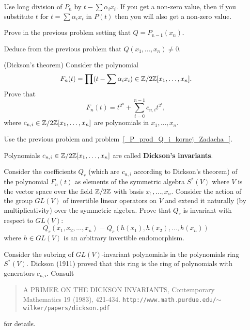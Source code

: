 \documentclass[12pt]{article}
\begin{document}
\begin{ukazanie}
Use long division of $P_n$ by $t-\sum \alpha_i x_i$. If you get a
non-zero value, then if you substitute $t$ for $t=\sum \alpha_i x_i$
in $P(t)$ then you will also get a non-zero value.
\end{ukazanie}

\begin{zadacha}[*]
Prove in the previous problem setting that $Q = P_{n-1}(x_n)$.
\end{zadacha}

\begin{zadacha}[*]
Deduce from the previous problem that
$Q(x_1, \dots, x_n)\neq 0$.
\end{zadacha}

\begin{zadacha}[*]
(Dickson's theorem)
Consider the polynomial 
$$
F_n(t)=\prod (t-\sum
 \alpha_i x_i)\in {\mathbb Z}/2{\mathbb Z}[x_1, \dots, x_n].
$$ 
Prove that 
\[ 
F_n(t) = t^{2^n} + \sum^{n-1}_{i=0} c_{n,i} t^{2^i},
\]
where $c_{n,i}\in {\mathbb Z}/2{\mathbb Z}[x_1, \dots, x_n]$ are polynomials in $x_1,
\dots, x_n$. 
\end{zadacha}

\begin{ukazanie}
Use the previous problem and problem~\ref{_P_prod_Q_i_kornej_Zadacha_}.
\end{ukazanie}

\begin{zamechanie}
Polynomials $c_{n,i}\in {\mathbb Z}/2{\mathbb Z}[x_1, \dots, x_n]$
are called {\bf Dickson's invariants}.
\end{zamechanie}

\begin{zadacha}[*]
Consider the coefficients $Q_r$ (which are $c_{n,i}$ according to
Dickson's theorem) of the polynomial $F_n(t)$ as elements of the
symmetric algebra $S^*(V)$  where $V$ is the vector space over the
field ${\mathbb Z}/2{\mathbb Z}$ with basis $x_1, \dots, x_n$. Consider the action of
the group $GL(V)$ of invertible linear operators on $V$ and extend it
naturally (by multiplicativity) over the symmetric algebra.
Prove that $Q_r$ is invariant with respect to $GL(V)$:
\[
Q_r(x_1, x_2, \dots, x_n) = Q_r(h(x_1), h(x_2), \dots, h(x_n))
\]
where $h\in GL(V)$ is an arbitrary invertible endomorphism.
\end{zadacha}

\begin{zamechanie}
Consider the subring of $GL(V)$-invariant polynomials in the
polynomials ring $S^*(V)$. Dickson (1911) proved that this ring is the
ring of polynomials with generators $c_{n,i}$.
Consult
\begin{quote}
A PRIMER ON THE DICKSON INVARIANTS, 
Contemporary Mathematics 19 (1983), 421-434.
{\tt http://www.math.purdue.edu/$\sim{}$wilker/papers/dickson.pdf}
\end{quote}
for details.
\end{zamechanie}
\end{document}
